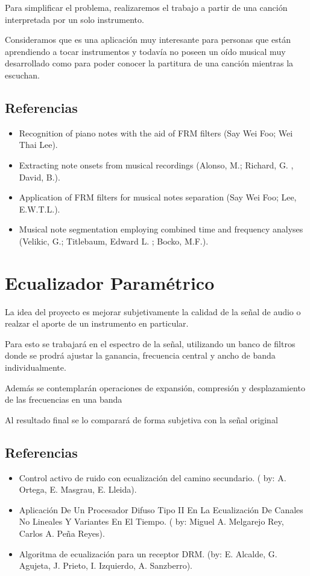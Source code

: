 \documentclass[a4paper,10pt]{article}
\begin{document}
	Para simplificar el problema, realizaremos el trabajo a partir
	de una canción interpretada por un solo instrumento.

	Consideramos que es una aplicación muy interesante para personas
	que están aprendiendo a tocar instrumentos y todavía no poseen
	un oído musical muy desarrollado como para poder conocer la
	partitura de una canción mientras la escuchan.

	\subsection*{Referencias}
		\begin{itemize}
			\item Recognition of piano notes with the aid
			of FRM filters (Say Wei Foo; Wei Thai Lee).
			\item Extracting note onsets from musical
			recordings (Alonso, M.; Richard, G. , David, B.).
			\item Application of FRM filters for musical
			notes separation (Say Wei Foo; Lee, E.W.T.L.).
			\item Musical note segmentation employing
			combined time and frequency analyses (Velikic,
			G.; Titlebaum, Edward L. ; Bocko, M.F.).
		\end{itemize}

	\clearpage

\section*{Ecualizador Paramétrico}
	La idea del proyecto es mejorar subjetivamente la calidad de
	la señal de audio o realzar el aporte de un instrumento en
	particular.

	Para esto se trabajará en el espectro de la señal, utilizando un
	banco de filtros donde se prodrá ajustar la ganancia, frecuencia
	central y ancho de banda individualmente.

	Además se contemplarán operaciones de expansión, compresión
	y desplazamiento de las frecuencias en una banda

	Al resultado final se lo comparará de forma subjetiva con la
	señal original

	\subsection*{Referencias}
		\begin{itemize}
			\item Control activo de ruido con ecualización
			del camino secundario. ( by: A. Ortega,
			E. Masgrau, E. Lleida).
			\item Aplicación De Un Procesador Difuso Tipo
			II En La Ecualización De Canales No Lineales
			Y Variantes En El Tiempo. ( by: Miguel A.
			Melgarejo Rey, Carlos A. Peña Reyes).
			\item Algoritma de ecualización para un receptor
			DRM. (by: E. Alcalde, G.  Agujeta, J. Prieto,
			I. Izquierdo, A. Sanzberro).
		\end{itemize}

	\clearpage
\end{document}
